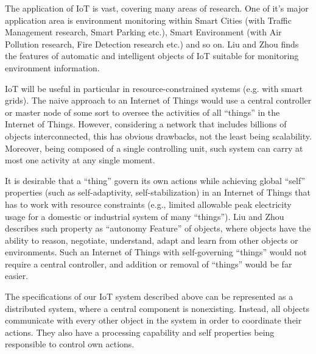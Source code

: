 \documentclass[../main/Self-Stabilization.tex]{subfiles}
\begin{document}
The application of IoT is vast, covering many areas of research. One of it's major application area is environment monitoring within Smart Cities (with Traffic Management research, Smart Parking etc.), Smart Environment (with Air Pollution research, Fire Detection research etc.) and so on. Liu and Zhou \cite{IoT6150221} finds the features of automatic and intelligent objects of IoT suitable for monitoring environment information.

IoT will be useful in particular in resource-constrained systems (e.g. with smart grids). The naive approach to an Internet of Things would use a central controller or master node of some sort to oversee the activities of all ``things'' in the Internet of Things. However, considering a network that includes billions of objects interconnected, this has obvious drawbacks, not the least being scalability. Moreover, being composed of a single controlling unit, such system can carry at most one activity at any single moment.

It is desirable that a ``thing'' govern its own actions while achieving global ``self'' properties (such as self-adaptivity, self-stabilization) in an Internet of Things that has to work with resource constraints (e.g., limited allowable peak electricity usage for a domestic or industrial system of many ``things''). Liu and Zhou \cite{IoT6150221} describes such property as ``autonomy Feature'' of objects, where objects have the ability to reason, negotiate, understand, adapt and learn from other objects or environments. Such an Internet of Things with self-governing ``things'' would not require a central controller, and addition or removal of ``things'' would be far easier.

The specifications of our IoT system described above can be represented as a distributed system, where a central component is nonexisting. Instead, all objects communicate with every other object in the system in order to coordinate their actions. They also have a processing capability and self properties being responsible to control own actions.
\end{document}
